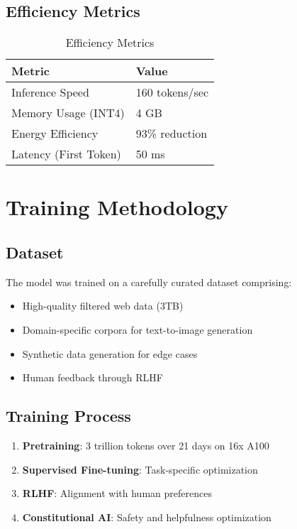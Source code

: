 \documentclass[11pt,a4paper]{article}
\begin{document}
\subsection{Efficiency Metrics}

\begin{table}[H]
\centering
\begin{tabular}{ll}
\toprule
\textbf{Metric} & \textbf{Value} \\
\midrule
Inference Speed & 160 tokens/sec \\
Memory Usage (INT4) & 4 GB \\
Energy Efficiency & 93\% reduction \\
Latency (First Token) & 50 ms \\
\bottomrule
\end{tabular}
\caption{Efficiency Metrics}
\end{table}

\section{Training Methodology}

\subsection{Dataset}
The model was trained on a carefully curated dataset comprising:
\begin{itemize}
    \item High-quality filtered web data (3TB)
    \item Domain-specific corpora for text-to-image generation
    \item Synthetic data generation for edge cases
    \item Human feedback through RLHF
\end{itemize}

\subsection{Training Process}
\begin{enumerate}
    \item \textbf{Pretraining}: 3 trillion tokens over 21 days on 16x A100
    \item \textbf{Supervised Fine-tuning}: Task-specific optimization
    \item \textbf{RLHF}: Alignment with human preferences
    \item \textbf{Constitutional AI}: Safety and helpfulness optimization
\end{enumerate}
\end{document}
